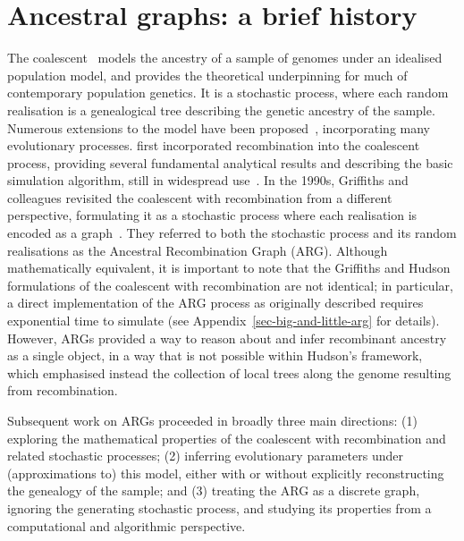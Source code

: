 \documentclass{article}
\begin{document}
\section{Ancestral graphs: a brief history}
\label{sec-arg-history}
The coalescent~\citep{kingman1982coalescent,kingman1982genealogy,
hudson1983testing, tajima1983evolutionary} models the ancestry of a sample of
genomes under an idealised population model, and provides the theoretical
underpinning for much of contemporary population genetics.
It is a stochastic process, where each random realisation
is a genealogical tree describing the genetic ancestry of the sample.
Numerous extensions to the model have been
proposed~\citep{hudson1990gene,hein2004gene,wakely2008coalescent},
incorporating many evolutionary processes.
\citet{hudson1983properties}
first incorporated recombination into the coalescent process,
providing several fundamental analytical results
and describing the basic simulation algorithm, still in
widespread use~\citep{hudson2002generating,kelleher2016efficient,
baumdicker2021efficient}.
In the 1990s, Griffiths and colleagues revisited the
coalescent with recombination from a different perspective,
formulating it as a stochastic process where each realisation
is encoded as a graph~\citep{griffiths1991two,ethier1990two,
griffiths1996ancestral,griffiths1997ancestral}.
They referred to both the stochastic process and
its random realisations as the Ancestral Recombination Graph (ARG).
Although mathematically equivalent, it is
important to note that the Griffiths and Hudson formulations of
the coalescent with recombination are not identical;
in particular, a direct implementation of the ARG process
as originally described requires exponential time to simulate
(see Appendix~\ref{sec-big-and-little-arg} for details).
However, ARGs provided a way
to reason about and infer recombinant ancestry as a single object,
in a way that is not possible within Hudson's framework, which emphasised
instead the collection of local trees along the genome
resulting from recombination.

Subsequent work on ARGs proceeded in broadly three main directions:
(1) exploring the mathematical properties of the coalescent with recombination and
related stochastic processes;
(2) inferring evolutionary parameters under
(approximations to) this model, either with or without explicitly reconstructing the
genealogy of the sample;
and (3) treating the ARG as a discrete graph, ignoring the
generating stochastic process, and studying its properties from a computational and
algorithmic perspective.
\end{document}
